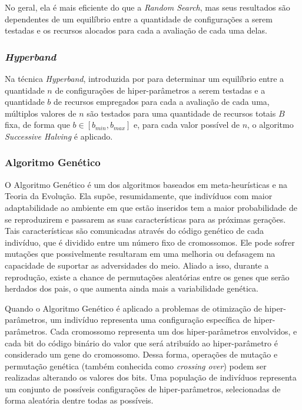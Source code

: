 No geral, ela é mais eficiente do que a \textit{Random Search}, mas seus resultados são dependentes de um equilíbrio entre a quantidade de configurações a serem testadas e os recursos alocados para cada a avaliação de cada uma delas.

\subsubsection{\textit{Hyperband}}\label{hyperband}

Na técnica \textit{Hyperband}, introduzida por  para determinar um equilíbrio entre a quantidade $n$ de configurações de hiper-parâmetros a serem testadas e a quantidade $b$ de recursos empregados para cada a avaliação de cada uma, múltiplos valores de $n$ são testados para uma quantidade de recursos totais $B$ fixa, de forma que $b \in [b_{min}, b_{max}] $ e, para cada valor possível de $n$, o algoritmo \textit{Successive Halving} é aplicado.

\subsubsection{Algoritmo Genético}\label{algoritmos_geneticos}

O Algoritmo Genético é um dos algoritmos baseados em meta-heurísticas e na Teoria da Evolução. Ela supõe, resumidamente, que indivíduos com maior adaptabilidade ao ambiente em que estão inseridos tem a maior probabilidade de se reproduzirem e passarem as suas características para as próximas gerações. Tais características são comunicadas através do código genético de cada indivíduo, que é dividido entre um número fixo de cromossomos. Ele pode sofrer mutações que possivelmente resultaram em uma melhoria ou defasagem na capacidade de suportar as adversidades do meio. Aliado a isso, durante a reprodução, existe a chance de permutações aleatórias entre os genes que serão herdados dos pais, o que aumenta ainda mais a variabilidade genética.

Quando o Algoritmo Genético é aplicado a problemas de otimização de hiper-parâmetros, um indivíduo representa uma configuração específica de hiper-parâmetros. Cada cromossomo representa um dos hiper-parâmetros envolvidos, e cada bit do código binário do valor que será atribuído ao hiper-parâmetro é considerado um gene do cromossomo. Dessa forma, operações de mutação e permutação genética (também conhecida como \textit{crossing over}) podem ser realizadas alterando os valores dos bits. Uma população de indivíduos representa um conjunto de possíveis configurações de hiper-parâmetros, selecionadas de forma aleatória dentre todas as possíveis.

